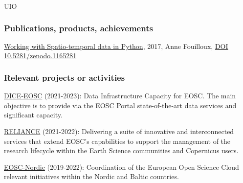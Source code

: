 \begin{sitedescription}{UIO}
    
    
    
    
    
    
    
    \subsubsection*{Publications, products, achievements}
    
    \begin{compactenum}
    
    \item \href{https://annefou.github.io/metos_python/}{Working with Spatio-temporal data in Python}, 2017, Anne Fouilloux, \href{https://zenodo.org/badge/latestdoi/96184802}{DOI 10.5281/zenodo.1165281}
    \end{compactenum}
    
    \subsubsection*{Relevant projects or activities}
    
    \begin{compactenum}
    
    
    \item \href{https://www.dice-eosc.eu/}{DICE-EOSC} \label{desc:diceeosc} (2021-2023):
    Data Infrastructure Capacity for EOSC. The main objective is to provide via the EOSC Portal state-of-the-art data services and significant capacity.
    
    \item \href{https://www.reliance-project.eu/}{RELIANCE} \label{desc:reliance} (2021-2022):
    Delivering a suite of innovative and interconnected services that extend EOSC’s capabilities to support the management of the research lifecycle within the Earth Science communities and Copernicus users.
    
    \item \href{https://www.eosc-nordic.eu/}{EOSC-Nordic} \label{desc:eoscnordic} (2019-2022):
    Coordination of the European Open Science Cloud relevant initiatives within the Nordic and Baltic countries.
    

\end{compactenum}
\end{sitedescription}
